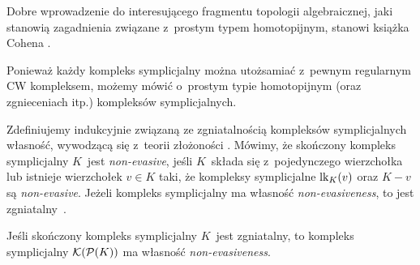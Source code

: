 Dobre wprowadzenie do interesującego fragmentu topologii algebraicznej, jaki stanowią zagadnienia związane z~prostym typem homotopijnym, stanowi książka Cohena \cite{Cohen73}.

Ponieważ każdy kompleks symplicjalny można utożsamiać z~pewnym regularnym CW kompleksem, możemy mówić o~prostym typie homotopijnym (oraz zgnieceniach itp.) kompleksów symplicjalnych.

Zdefiniujemy indukcyjnie związaną ze zgniatalnością kompleksów symplicjalnych własność, wywodzącą się z~teorii złożoności \cite{Kahn84}. Mówimy, że skończony kompleks symplicjalny $K$~jest \textit{non-evasive}, jeśli $K$~składa się z~pojedynczego wierzchołka lub istnieje wierzchołek $v\in K$ taki, że kompleksy symplicjalne $\operatorname{lk}_K(v)$ oraz $K-v$ są \textit{non-evasive}. Jeżeli kompleks symplicjalny ma własność \mbox{\textit{non-evasiveness}}, to jest zgniatalny~\cite{Kahn84}.

\begin{tw}\label{tw_welkera_o_zgniatalnosci_podzialu}
Jeśli skończony kompleks symplicjalny $K$~jest zgniatalny, to kompleks symplicjalny $\mathcal{K}(\mathcal{P}(K))$ ma własność \textit{non-evasiveness}.
\end{tw}






